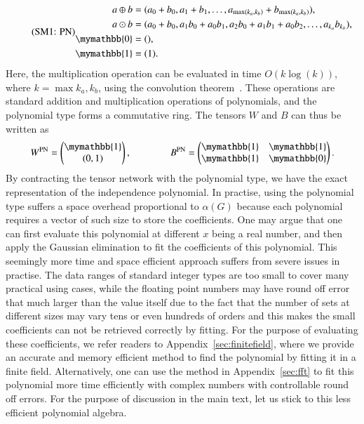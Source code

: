 \documentclass[onefignum, onetabnum]{siamart190516}
\newcommand{\eqname}[1]{\stepcounter{equation}\tag{\theequation : #1}}
\newcommand{\<}{\langle}
\renewcommand{\>}{\rangle}
\newcommand{\App}[1]{Appendix~\ref{#1}}
\begin{document}
\begin{equation}
    \eqname{PN}
    \begin{split}
    a \oplus b &= (a_0 + b_0, a_1 + b_1, \ldots, a_{\max(k_a, k_b)} + b_{\max(k_a, k_b)}),\\
    a \odot b &= (a_0 + b_0, a_1b_0 + a_0b_1, a_{2}b_{0} + a_{1}b_{1} + a_{0}b_{2},  \ldots, a_{k_a} b_{k_b}),\\
    \mymathbb{0} &= (),  \\
    \mymathbb{1} &= (1).\label{eq:polynomial}
    \end{split}
\end{equation}
Here, the multiplication operation can be evaluated in time $O(k\log(k))$, where $k=\max{k_a, k_b}$, using the convolution theorem~\cite{Schonhage1971}.
These operations are standard addition and multiplication operations of polynomials, and the polynomial type forms a commutative ring. The tensors $W$ and $B$ can thus be written as 
\begin{equation}
    W^{\rm PN} = \left(\begin{matrix}
        \mymathbb{1} \\
        (0,1)
    \end{matrix}\right),   
    \qquad \qquad
        B^{\rm PN} = \left(\begin{matrix}
        \mymathbb{1}  & \mymathbb{1} \\
        \mymathbb{1} & \mymathbb{0}
    \end{matrix}\right).
\end{equation}
By contracting the tensor network with the polynomial type, we have the exact representation of the independence polynomial.
In practise, using the polynomial type suffers a space overhead proportional to $\alpha(G)$ because each polynomial requires a vector of such size to store the coefficients. 
One may argue that one can first evaluate this polynomial at different $x$ being a real number,
and then apply the Gaussian elimination to fit the coefficients of this polynomial.
This seemingly more time and space efficient approach suffers from severe issues in practise.
The data ranges of standard integer types are too small to cover many practical using cases,
while the floating point numbers may have round off error that much larger than the value itself
due to the fact that the number of sets at different sizes may vary tens or even hundreds of orders and this makes the small coefficients can not be retrieved correctly by fitting.
For the purpose of evaluating these coefficients, we refer readers to \App{sec:finitefield}, where we provide an accurate and memory efficient method to find the polynomial by fitting it in a finite field.
Alternatively, one can use the method in \App{sec:fft} to fit this polynomial more time efficiently with complex numbers with controllable round off errors.
For the purpose of discussion in the main text, let us stick to this less efficient polynomial algebra.
\end{document}
